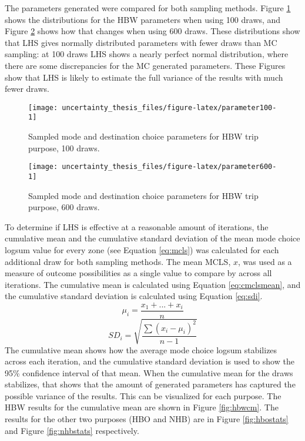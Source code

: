 \documentclass[fancy, masters, twoside]{byuthesis}
\begin{document}
The parameters generated were compared for both sampling methods. Figure \ref{fig:parameter100} shows the distributions for the HBW parameters when using 100 draws, and Figure \ref{fig:parameter600} shows how that changes when using 600 draws. These distributions show that LHS gives normally distributed parameters with fewer draws than MC sampling: at 100 draws LHS shows a nearly perfect normal distribution, where there are some discrepancies for the MC generated parameters. These Figures show that LHS is likely to estimate the full variance of the results with much fewer draws.

\begin{figure}

{\centering \texttt{[image: uncertainty\_thesis\_files/figure-latex/parameter100-1]} 

}

\caption{Sampled mode and destination choice parameters for HBW trip purpose, 100 draws.}\label{fig:parameter100}
\end{figure}

\begin{figure}

{\centering \texttt{[image: uncertainty\_thesis\_files/figure-latex/parameter600-1]} 

}

\caption{Sampled mode and destination choice parameters for HBW trip purpose, 600 draws.}\label{fig:parameter600}
\end{figure}

To determine if LHS is effective at a reasonable amount of iterations, the cumulative mean and the cumulative standard deviation of the mean mode choice logsum value for every zone (see Equation \eqref{eq:mcls}) was calculated for each additional draw for both sampling methods. The mean MCLS, \(x\), was used as a measure of outcome possibilities as a single value to compare by across all iterations. The cumulative mean is calculated using Equation \eqref{eq:cmclsmean}, and the cumulative standard deviation is calculated using Equation \eqref{eq:sdi}.
\begin{equation}
\mu_i = \frac{x_1 + ... + x_i}{n}
\label{eq:cmclsmean}
\end{equation}
\begin{equation}
SD_i = \sqrt{\frac{\sum (x_i - \mu_i)^2 }{n-1}}
\label{eq:sdi}
\end{equation}
The cumulative mean shows how the average mode choice logsum stabilizes across each iteration, and the cumulative standard deviation is used to show the 95\% confidence interval of that mean. When the cumulative mean for the draws stabilizes, that shows that the amount of generated parameters has captured the possible variance of the results. This can be visualized for each purpose. The HBW results for the cumulative mean are shown in Figure \ref{fig:hbwcm}. The results for the other two purposes (HBO and NHB) are in Figure \ref{fig:hbostats} and Figure \ref{fig:nhbstats} respectively.
\end{document}
